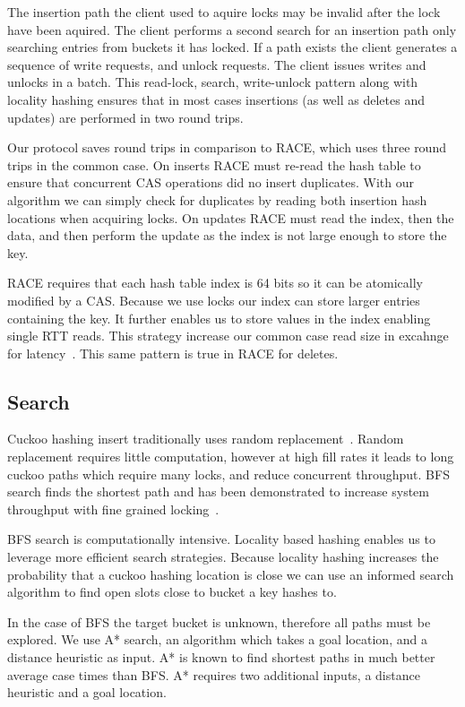 The insertion path the client used to aquire locks may be
invalid after the lock have been aquired. The client
performs a second search for an insertion path only
searching entries from buckets it has locked. If a path
exists the client generates a sequence of write requests,
and unlock requests. The client issues writes and unlocks in
a batch. This read-lock, search, write-unlock pattern along
with locality hashing ensures that in most cases insertions
(as well as deletes and updates) are performed in two round
trips.

Our protocol saves round trips in comparison to RACE, which
uses three round trips in the common case. On inserts RACE
must re-read the hash table to ensure that concurrent CAS
operations did no insert duplicates. With our algorithm we
can simply check for duplicates by reading both insertion
hash locations when acquiring locks. On updates RACE must
read the index, then the data, and then perform the update
as the index is not large enough to store the key. 

RACE requires that each hash table index is 64 bits so it
can be atomically modified by a CAS. Because we use locks
our index can store larger entries containing the key. It
further enables us to store values in the index enabling
single RTT reads. This strategy increase our common case
read size in excahnge for latency~.
This same pattern is true in RACE for deletes. 

\subsection{Search}
Cuckoo hashing insert traditionally uses random
replacement~\cite{cuckoo}. Random replacement requires
little computation, however at high fill rates it leads to
long cuckoo paths which require many locks, and reduce
concurrent throughput. BFS search finds the shortest path
and has been demonstrated to increase system throughput with
fine grained locking~\cite{algorithmic-improvements}.

BFS search is computationally intensive. Locality based
hashing enables us to leverage more efficient search
strategies. Because locality hashing increases the
probability that a cuckoo hashing location is close we can
use an informed search algorithm to find open slots close to
bucket a key hashes to. 

In the case of BFS the target bucket is unknown, therefore
all paths must be explored. We use A* search, an algorithm
which takes a goal location, and a distance heuristic as
input. A* is known to find shortest paths in much better
average case times than BFS. A* requires two additional
inputs, a distance heuristic and a goal location.

